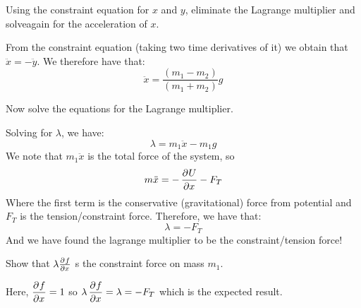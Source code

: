 \documentclass[../PHYS306Notes.tex]{subfiles}
\begin{document}
\begin{p}
Using the constraint equation for $x$ and $y$, eliminate the Lagrange multiplier and solveagain for the acceleration of $x$.
\end{p}
\begin{s}
From the constraint equation (taking two time derivatives of it) we obtain that $\ddot{x} = -\ddot{y}$. We therefore have that:
\[\ddot{x} = \frac{(m_1 - m_2)}{(m_1 + m_2)}g\]
\end{s}

\begin{p}
Now solve the equations for the Lagrange multiplier.
\end{p}
\begin{s}
Solving for $\lambda$, we have:
\[\lambda = m_1\ddot{x} - m_1g\]
We note that $m_1\ddot{x}$ is the total force of the system, so
\[m\ddot{x} = -\dpd{U}{x} - F_{T}\]
Where the first term is the conservative (gravitational) force from potential and $F_T$ is the tension/constraint force. Therefore, we have that:
\[\lambda = -F_T\]
And we have found the lagrange multiplier to be the constraint/tension force!
\end{s}

\begin{p}
Show that $\lambda \pd{f}{x}$ s the constraint force on mass $m_1$.
\end{p}
\begin{s}
Here, $\dpd{f}{x} = 1$ so $\lambda\dpd{f}{x} = \lambda = -F_T$ which is the expected result.
\end{s}
\end{document}
